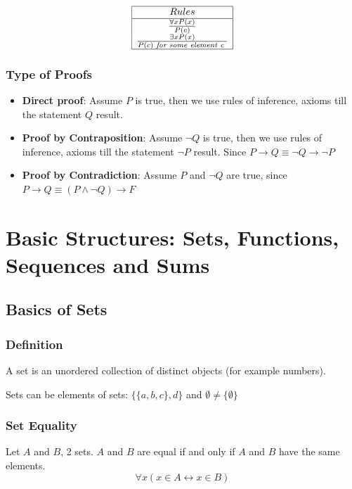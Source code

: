 \documentclass{article}
\begin{document}
\begin{center}
\[
\begin{array}{|c|c|c|c|} \hline
Rules\\ \hline
\frac{\forall x P(x)}{P(c)} \\
\frac{\exists x P(x)}{P(c) \textit{ for some element c }}\\
\hline
\end{array}
\]
\end{center}


\subsubsection{Type of Proofs}
\begin{itemize}
\item \textbf{Direct proof}: Assume $ P $ is true, then we use rules of inference, axioms till the statement $ Q $ result.
\item \textbf{Proof by Contraposition}: Assume $ \neg Q $ is true, then we use rules of inference, axioms till the statement $ \neg P $ result. Since $ P \rightarrow Q \equiv \neg Q \rightarrow \neg P $
\item \textbf{Proof by Contradiction}: Assume $ P $ and $ \neg Q $ are true, since $ P \rightarrow Q \equiv (P \wedge \neg Q) \rightarrow F  $
\end{itemize}

\newpage
\section{Basic Structures: Sets, Functions, Sequences and Sums}
\subsection{Basics of Sets}
\subsubsection{Definition} A set is an unordered collection of distinct objects (for example numbers).

\begin{tcolorbox}[width=12.1cm, leftrule=3mm]
Sets can be elements of sets: $ \{\{a,b,c\},d\} $ and $ \emptyset \neq \{ \emptyset \} $
\end{tcolorbox}

\subsubsection{Set Equality} Let $ A $ and $ B $, 2 sets. $ A $ and $ B $ are equal if and only if $ A $ and $ B $ have the same elements.
\begin{equation}
\forall x(x \in A \longleftrightarrow x \in B)
\end{equation}
\end{document}
